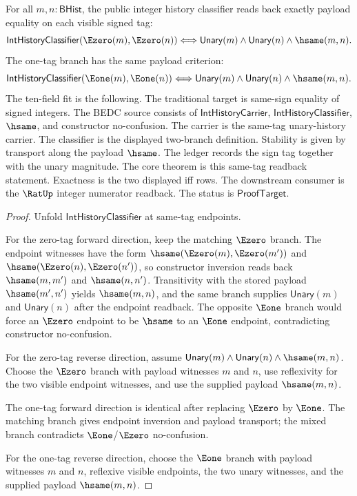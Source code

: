 \begin{theorem}
\label{thm:int-history-classifier-same-tag-readback}
For all $m,n:\mathsf{BHist}$, the public integer history classifier reads back
exactly payload equality on each visible signed tag:
$$
\mathsf{IntHistoryClassifier}(\Ezero(m),\Ezero(n))
\Longleftrightarrow
\mathsf{Unary}(m)\land\mathsf{Unary}(n)\land\hsame(m,n).
$$
The one-tag branch has the same payload criterion:
$$
\mathsf{IntHistoryClassifier}(\Eone(m),\Eone(n))
\Longleftrightarrow
\mathsf{Unary}(m)\land\mathsf{Unary}(n)\land\hsame(m,n).
$$
The ten-field fit is the following. The traditional target is same-sign
equality of signed integers. The BEDC source consists of
$\mathsf{IntHistoryCarrier}$, $\mathsf{IntHistoryClassifier}$, $\hsame$, and
constructor no-confusion. The carrier is the same-tag unary-history carrier.
The classifier is the displayed two-branch definition. Stability is given by
transport along the payload $\hsame$. The ledger records the sign tag together
with the unary magnitude. The core theorem is this same-tag readback statement.
Exactness is the two displayed iff rows. The downstream consumer is the
$\RatUp$ integer numerator readback. The status is $\mathsf{ProofTarget}$.
\end{theorem}
\begin{proof}
Unfold $\mathsf{IntHistoryClassifier}$ at same-tag endpoints.

For the zero-tag forward direction, keep the matching $\Ezero$ branch. The
endpoint witnesses have the form $\hsame(\Ezero(m),\Ezero(m'))$ and
$\hsame(\Ezero(n),\Ezero(n'))$, so constructor inversion reads back
$\hsame(m,m')$ and $\hsame(n,n')$. Transitivity with the stored payload
$\hsame(m',n')$ yields $\hsame(m,n)$, and the same branch supplies
$\mathsf{Unary}(m)$ and $\mathsf{Unary}(n)$ after the endpoint readback. The
opposite $\Eone$ branch would force an $\Ezero$ endpoint to be $\hsame$ to an
$\Eone$ endpoint, contradicting constructor no-confusion.

For the zero-tag reverse direction, assume
$\mathsf{Unary}(m)\land\mathsf{Unary}(n)\land\hsame(m,n)$. Choose the
$\Ezero$ branch with payload witnesses $m$ and $n$, use reflexivity for the
two visible endpoint witnesses, and use the supplied payload $\hsame(m,n)$.

The one-tag forward direction is identical after replacing $\Ezero$ by
$\Eone$. The matching branch gives endpoint inversion and payload transport;
the mixed branch contradicts $\Eone$/$\Ezero$ no-confusion.

For the one-tag reverse direction, choose the $\Eone$ branch with payload
witnesses $m$ and $n$, reflexive visible endpoints, the two unary witnesses,
and the supplied payload $\hsame(m,n)$.
\end{proof}
